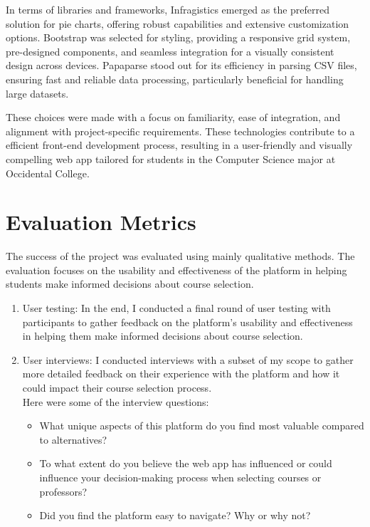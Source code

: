 \documentclass[10pt,twocolumn]{article}
\begin{document}
In terms of libraries and frameworks, Infragistics emerged as the preferred solution for pie charts, offering robust capabilities and extensive customization options. Bootstrap was selected for styling, providing a responsive grid system, pre-designed components, and seamless integration for a visually consistent design across devices. Papaparse stood out for its efficiency in parsing CSV files, ensuring fast and reliable data processing, particularly beneficial for handling large datasets.

These choices were made with a focus on familiarity, ease of integration, and alignment with project-specific requirements. These technologies contribute to a efficient front-end development process, resulting in a user-friendly and visually compelling web app tailored for students in the Computer Science major at Occidental College.


\section{Evaluation Metrics}

The success of the project was evaluated using mainly qualitative methods. The evaluation focuses on the usability and effectiveness of the platform in helping students make informed decisions about course selection.

\begin{enumerate}
\item User testing: In the end, I conducted a final round of user testing with participants to gather feedback on the platform's usability and effectiveness in helping them make informed decisions about course selection.\\


\item User interviews: I conducted interviews with a subset of my scope to gather more detailed feedback on their experience with the platform and how it could impact their course selection process.\\


Here were some of the interview questions:
\begin{itemize}
\item What unique aspects of this platform do you find most valuable compared to alternatives?
\item To what extent do you believe the web app has influenced or could influence your decision-making process when selecting courses or professors?
\item Did you find the platform easy to navigate? Why or why not?
\end{itemize}
\end{enumerate}
\end{document}
